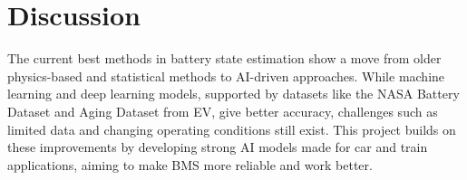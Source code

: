
\section{Discussion}
The current best methods in battery state estimation show a move from older physics-based and statistical methods to AI-driven approaches. While machine learning and deep learning models, supported by datasets like the NASA Battery Dataset and Aging Dataset from EV, give better accuracy, challenges such as limited data and changing operating conditions still exist. This project builds on these improvements by developing strong AI models made for car and train applications, aiming to make BMS more reliable and work better.